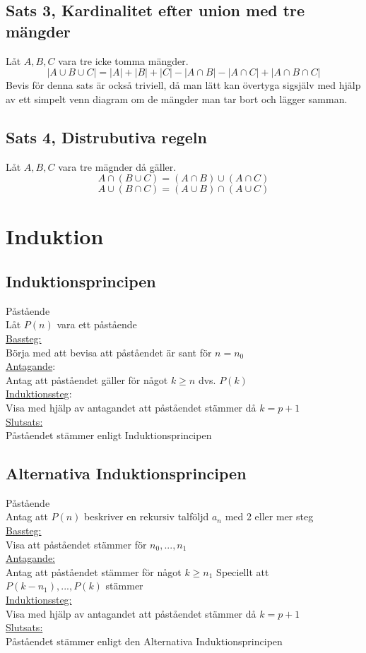 \documentclass{article}
\begin{document}
	\subsection{Sats 3, Kardinalitet efter union med tre mängder}
	Låt $A, B, C$ vara tre icke tomma mängder.
	$$ |A \cup B \cup C| = |A| + |B| + |C| - |A \cap B| - |A \cap C| + |A \cap B \cap C| $$
	Bevis för denna sats är också triviell, då man lätt kan övertyga sigsjälv med hjälp av ett simpelt venn diagram om de mängder man tar bort och lägger samman. 

	\subsection{Sats 4, Distrubutiva regeln}
	Låt $A, B, C$ vara tre mägnder då gäller. 
	$$ A \cap (B \cup C) = (A \cap B) \cup (A \cap C) $$
	$$ A \cup (B \cap C) = (A \cup B) \cap (A \cup C) $$
	\newpage
		
	\section{Induktion}
	\subsection{Induktionsprincipen}
	Påstående \\ 
	Låt $P(n)$ vara ett påstående \\
	\underline{Bassteg:} \\
	Börja med att bevisa att påståendet är sant för $n = n_{0}$ \\
	\underline{Antagande}: \\
	Antag att påståendet gäller för något $k \geq n$ dvs. $P(k)$ \\
	\underline{Induktionssteg}: \\
	Visa med hjälp av antagandet att påståendet stämmer då $k = p + 1$ \\
	\underline{Slutsats:} \\
	Påståendet stämmer enligt Induktionsprincipen \\
	\subsection{Alternativa Induktionsprincipen}
	Påstående \\
	Antag att $P(n)$ beskriver en rekursiv talföljd $a_{n}$ med 2 eller mer steg \\
	\underline{Bassteg:} \\
	Visa att påståendet stämmer för $n_{0}, ... , n_{1}$ \\
	\underline{Antagande:} \\
	Antag att påståendet stämmer för något $k \geq n_{1}$ Speciellt att $P(k-n_{1}), ... , P(k)$ stämmer \\
	\underline{Induktionssteg:} \\
	Visa med hjälp av antagandet att påståendet stämmer då $k = p + 1$ \\
	\underline{Slutsats:} \\
	Påståendet stämmer enligt den Alternativa Induktionsprincipen \\
\end{document}
